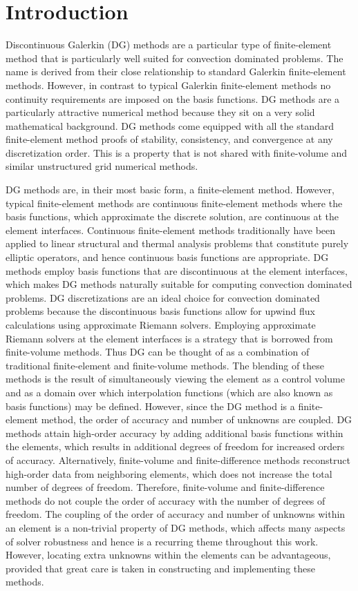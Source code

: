 \chapter{Introduction}
Discontinuous Galerkin (DG) methods are a particular type of finite-element method that is particularly well suited for convection dominated problems.  The name is derived from their close relationship to standard Galerkin finite-element methods.  However, in contrast to typical Galerkin finite-element methods no continuity requirements are imposed on the basis functions.  DG methods are a particularly attractive numerical method because they sit on a very solid mathematical background.  DG methods come equipped with all the standard finite-element method proofs of stability, consistency, and convergence at any discretization order.  This is a property that is not shared with finite-volume and similar unstructured grid numerical methods.  

DG methods are, in their most basic form, a finite-element method.  However, typical finite-element methods are continuous finite-element methods where the basis functions, which approximate the discrete solution, are continuous at the element interfaces.  Continuous finite-element methods traditionally have been applied to linear structural and thermal analysis problems that constitute purely elliptic operators, and hence continuous basis functions are appropriate.  DG methods employ basis functions that are discontinuous at the element interfaces, which makes DG methods naturally suitable for computing convection dominated problems.  DG discretizations are an ideal choice for convection dominated problems because the discontinuous basis functions allow for upwind flux calculations using approximate Riemann solvers.  Employing approximate Riemann solvers at the element interfaces is a strategy that is borrowed from finite-volume methods.  Thus DG can be thought of as a combination of traditional finite-element and finite-volume methods.  The blending of these methods is the result of simultaneously viewing the element as a control volume and as a domain over which interpolation functions (which are also known as basis functions) may be defined.  However, since the DG method is a finite-element method, the order of accuracy and number of unknowns are coupled.  DG methods attain high-order accuracy by adding additional basis functions within the elements, which results in additional degrees of freedom for increased orders of accuracy.  Alternatively, finite-volume and finite-difference methods reconstruct high-order data from neighboring elements, which does not increase the total number of degrees of freedom.  Therefore, finite-volume and finite-difference methods do not couple the order of accuracy with the number of degrees of freedom.  The coupling of the order of accuracy and number of unknowns within an element is a non-trivial property of DG methods, which affects many aspects of solver robustness and hence is a recurring theme throughout this work.   However, locating extra unknowns within the elements can be advantageous, provided that great care is taken in constructing and implementing these methods.     

